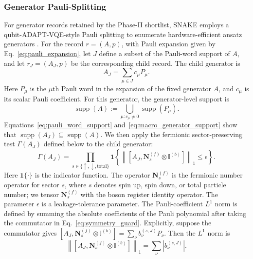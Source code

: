 \documentclass[
  reprint,
  amsmath,
  amssymb,
  aps,
  pra,
  nofootinbib,
  superscriptaddress,
  floatfix
]{revtex4-2}
\begin{document}
\subsubsection{Generator Pauli-Splitting}
For generator records retained by the Phase-II shortlist, \textsc{SNAKE}
employs a qubit-ADAPT-VQE-style Pauli splitting to enumerate
hardware-efficient ansatz generators \cite{Tang2021}. For the record
\(r=(A,p)\), with Pauli expansion given by Eq.~\eqref{eq:pauli_expansion}, let
\(J\) define a subset of the Pauli-word support of \(A\), and let
\(r_J=(A_J,p)\) be the corresponding child record. The child generator is
\begin{equation*}
A_J=\sum_{\mu\in J}c_{\mu}P_{\mu}.
\end{equation*}
Here \(P_{\mu}\) is the \(\mu\)th Pauli word in the expansion of the fixed
generator \(A\), and \(c_{\mu}\) is its scalar Pauli coefficient.
For this generator, the generator-level support is
\begin{equation}
\operatorname{supp}(A)
:=
\bigcup_{\mu:c_{\mu}\ne0}
\operatorname{supp}(P_{\mu}).
\label{eq:macro_generator_support}
\end{equation}
Equations~\eqref{eq:pauli_word_support} and~\eqref{eq:macro_generator_support}
show that
\(\operatorname{supp}(A_J)\subseteq\operatorname{supp}(A)\). We then apply
the fermionic sector-preserving test \(\Gamma(A_J)\) defined below to the
child generator:
\begin{equation}
\Gamma(A_J)
=
\prod_{s\in\{\uparrow,\downarrow,\mathrm{total}\}}
\mathbf 1
\left\{
\left\|
\left[
A_J,\mathbf N_s^{(f)}\otimes \mathbb I^{(b)}
\right]
\right\|_1
\le \epsilon
\right\}.
\label{eq:symmetry_guard}
\end{equation}
Here \(\mathbf 1\{\cdot\}\) is the indicator function. The operator \(\mathbf N_s^{(f)}\) is the fermionic number operator for sector \(s\), where \(s\) denotes spin up, spin
down, or total particle number; we tensor \(\mathbf N_s^{(f)}\) with the boson
register identity operator. The parameter \(\epsilon\) is a leakage-tolerance
parameter. The Pauli-coefficient \(L^1\) norm is defined by summing the absolute
coefficients of the Pauli polynomial after taking the commutator in
Eq.~\eqref{eq:symmetry_guard}. Explicitly, suppose the commutator gives
\([A_J,\mathbf N_s^{(f)}\otimes \mathbb I^{(b)}]
=\sum_\nu b_\nu^{(s,J)}P_\nu\). Then the \(L^1\) norm is
\[
\left\|
\left[
A_J,\mathbf N_s^{(f)}\otimes \mathbb I^{(b)}
\right]
\right\|_1
=
\sum_\nu |b_\nu^{(s,J)}|.
\]
\end{document}
